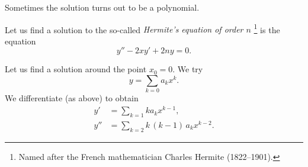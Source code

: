\documentclass[12pt]{book}
\begin{document}
Sometimes the solution turns out to be a polynomial.

\begin{example}
Let us find a solution to the so-called \emph{Hermite's equation
of order $n$}%
\footnote{Named after the French mathematician
Charles Hermite (1822--1901).} is the equation
\begin{equation*}
y'' -2xy' + 2n y = 0 .
\end{equation*}

Let us find a solution around the point $x_0 = 0$.
We try
\begin{equation*}
y = \sum_{k=0} a_k x^k .
\end{equation*}
We differentiate (as above) to obtain
\begin{align*}
y' &= \sum_{k=1} k a_k x^{k-1} ,
\\
y'' &= \sum_{k=2} k\,(k-1) \, a_k x^{k-2} .
\end{align*}


\end{example}
\end{document}
